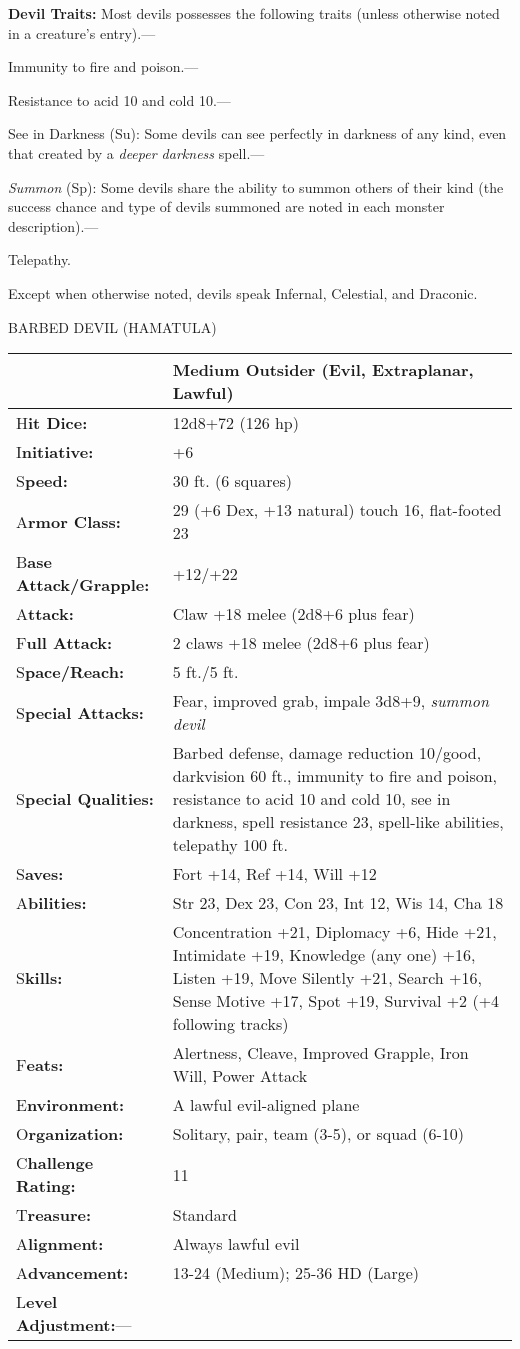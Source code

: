 \documentclass{article}
\begin{document}
\textbf{Devil Traits: }Most devils possesses the following traits (unless otherwise 
noted in a creature's entry).---

Immunity to fire and poison.---

Resistance to acid 10 and cold 10.---

See in Darkness (Su): Some devils can see perfectly in darkness of any kind, even 
that created by a \textit{deeper darkness }spell.---

\textit{Summon }(Sp): Some devils share the ability to summon others of their kind 
(the success chance and type of devils summoned are noted in each monster description).---

Telepathy. 

Except when otherwise noted, devils speak Infernal, Celestial, and Draconic.

\vspace{12pt}
BARBED DEVIL (HAMATULA)

\begin{tabular}{|>{\raggedright}p{91pt}|>{\raggedright}p{209pt}|}
\hline
  & Medium Outsider (Evil, Extraplanar, Lawful)\tabularnewline
\hline
H\textbf{it Dice:} & 12d8+72 (126 hp)\tabularnewline
\hline
I\textbf{nitiative:} & +6\tabularnewline
\hline
S\textbf{peed:} & 30 ft. (6 squares)\tabularnewline
\hline
A\textbf{rmor Class:} & 29 (+6 Dex, +13 natural) touch 16, flat-footed 23\tabularnewline
\hline
B\textbf{ase Attack/Grapple:} & +12/+22\tabularnewline
\hline
A\textbf{ttack:} & Claw +18 melee (2d8+6 plus fear)\tabularnewline
\hline
F\textbf{ull Attack:} & 2 claws +18 melee (2d8+6 plus fear)\tabularnewline
\hline
S\textbf{pace/Reach:} & 5 ft./5 ft.\tabularnewline
\hline
S\textbf{pecial Attacks:} & Fear, improved grab, impale 3d8+9, \textit{summon devil}\tabularnewline
\hline
S\textbf{pecial Qualities:} & Barbed defense, damage reduction 10/good, darkvision 
60 ft., immunity to fire and poison, resistance to acid 10 and cold 10, see in 
darkness, spell resistance 23, spell-like abilities, telepathy 100 ft.\tabularnewline
\hline
S\textbf{aves:} & Fort +14, Ref +14, Will +12\tabularnewline
\hline
A\textbf{bilities:} & Str 23, Dex 23, Con 23, Int 12, Wis 14, Cha 18\tabularnewline
\hline
S\textbf{kills:} & Concentration +21, Diplomacy +6, Hide +21, Intimidate +19, Knowledge 
(any one) +16, Listen +19, Move Silently +21, Search +16, Sense Motive +17, Spot 
+19, Survival +2 (+4 following tracks)\tabularnewline
\hline
F\textbf{eats:} & Alertness, Cleave, Improved Grapple, Iron Will, Power Attack\tabularnewline
\hline
E\textbf{nvironment:} & A lawful evil-aligned plane\tabularnewline
\hline
O\textbf{rganization:} & Solitary, pair, team (3-5), or squad (6-10)\tabularnewline
\hline
C\textbf{hallenge Rating:} & 11\tabularnewline
\hline
T\textbf{reasure:} & Standard\tabularnewline
\hline
A\textbf{lignment:} & Always lawful evil\tabularnewline
\hline
A\textbf{dvancement:} & 13-24 (Medium); 25-36 HD (Large)\tabularnewline
\hline
L\textbf{evel Adjustment:}--- & \tabularnewline
\hline
\end{tabular}
\end{document}

